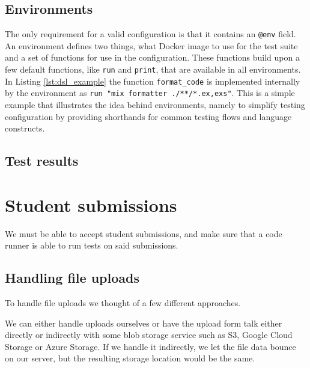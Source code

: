 \subsection{Environments}
The only requirement for a valid configuration is that it contains an \texttt{@env} field. An environment defines two things, what Docker image to use for the test suite and a set of functions for use in the configuration. These functions build upon a few default functions, like \texttt{run} and \texttt{print}, that are available in all environments. In Listing \ref{lst:dsl_example} the function \texttt{format_code} is implemented internally by the environment as \texttt{run "mix formatter ./**/*.{ex,exs}"}. This is a simple example that illustrates the idea behind environments, namely to simplify testing configuration by providing shorthands for common testing flows and language constructs.


\subsection{Test results}

\section{Student submissions}

We must be able to accept student submissions, and make sure that a code runner is able to run tests on said submissions.

\subsection{Handling file uploads}

To handle file uploads we thought of a few different approaches.

We can either handle uploads ourselves or have the upload form talk either directly or indirectly with some blob storage service such as S3, Google Cloud Storage or Azure Storage. If we handle it indirectly, we let the file data bounce on our server, but the resulting storage location would be the same.

